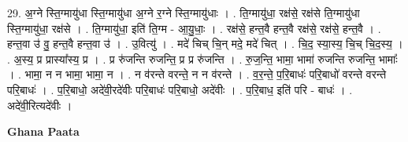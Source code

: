 \documentclass[17pt]{extarticle}
\begin{document}
29. अ॒ग्ने स्ति॒ग्मायु॑धा स्ति॒ग्मायु॑धा अ॒ग्ने र॒ग्ने स्ति॒ग्मायु॑धाः । . ति॒ग्मायु॑धा॒ रक्ष॑से॒ रक्ष॑से ति॒ग्मायु॑धा स्ति॒ग्मायु॑धा॒ रक्ष॑से । . ति॒ग्मायु॑धा॒ इति॑ ति॒ग्म - आ॒यु॒धाः॒ । . रक्ष॑से॒ हन्त॒वै हन्त॒वै रक्ष॑से॒ रक्ष॑से॒ हन्त॒वै । . हन्त॒वा उ॑ वु॒ हन्त॒वै हन्त॒वा उ॑ । . उ॒वित्यु॑ । . मदे॑ चिच् चि॒न् मदे॒ मदे॑ चित् । . चि॒द॒ स्या॒स्य॒ चि॒च् चि॒द॒स्य॒ । . अ॒स्य॒ प्र प्रास्या᳚स्य॒ प्र । . प्र रु॑जन्ति रुजन्ति॒ प्र प्र रु॑जन्ति । . रु॒ज॒न्ति॒ भामा॒ भामा॑ रुजन्ति रुजन्ति॒ भामाः᳚ । . भामा॒ न न भामा॒ भामा॒ न । . न व॑रन्ते वरन्ते॒ न न व॑रन्ते । . व॒र॒न्ते॒ प॒रि॒बाधः॑ परि॒बाधो॑ वरन्ते वरन्ते परि॒बाधः॑ । . प॒रि॒बाधो॒ अदे॑वी॒रदे॑वीः परि॒बाधः॑ परि॒बाधो॒ अदे॑वीः । . प॒रि॒बाध॒ इति॑ परि - बाधः॑ । . अदे॑वी॒रित्यदे॑वीः । \newline

\textbf{Ghana Paata } \newline
\end{document}
